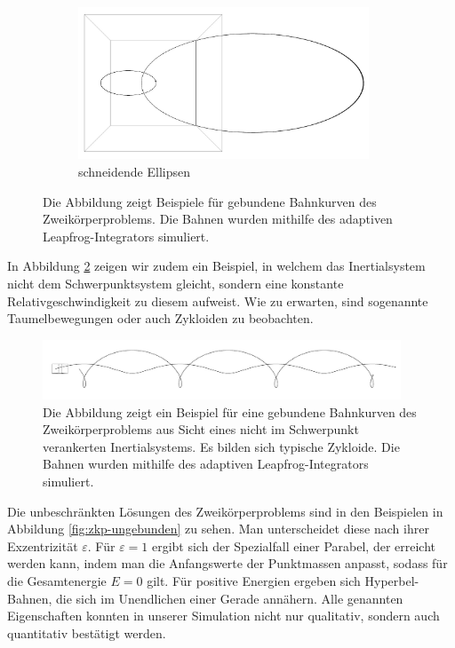 \begin{figure}
      \begin{subfigure}[b]{\textwidth}
        \center
        \includegraphics[width=0.95\textwidth]{pictures/two_body/ellipse_intersect.jpg}
        \caption{schneidende Ellipsen}
      \end{subfigure}
      \caption{Die Abbildung zeigt Beispiele für gebundene Bahnkurven des Zweikörperproblems. Die Bahnen wurden mithilfe des adaptiven Leapfrog-Integrators simuliert.}
      \label{fig:zkp-gebunden}
    \end{figure}

    In Abbildung \ref{fig:zkp-zykloide} zeigen wir zudem ein Beispiel, in welchem das Inertialsystem nicht dem Schwerpunktsystem gleicht, sondern eine konstante Relativgeschwindigkeit zu diesem aufweist.
    Wie zu erwarten, sind sogenannte Taumelbewegungen oder auch Zykloiden zu beobachten.

    \begin{figure}[h]
      \center
      \includegraphics[width=0.95\textwidth]{pictures/two_body/cycloid.jpg}
      \caption{Die Abbildung zeigt ein Beispiel für eine gebundene Bahnkurven des Zweikörperproblems aus Sicht eines nicht im Schwerpunkt verankerten Inertialsystems. Es bilden sich typische Zykloide. Die Bahnen wurden mithilfe des adaptiven Leapfrog-Integrators simuliert.}
      \label{fig:zkp-zykloide}
    \end{figure}

    Die unbeschränkten Lösungen des Zweikörperproblems sind in den Beispielen in Abbildung \ref{fig:zkp-ungebunden} zu sehen.
    Man unterscheidet diese nach ihrer Exzentrizität $\varepsilon$.
    Für $\varepsilon = 1$ ergibt sich der Spezialfall einer Parabel, der erreicht werden kann, indem man die Anfangswerte der Punktmassen anpasst, sodass für die Gesamtenergie $E=0$ gilt.
    Für positive Energien ergeben sich Hyperbel-Bahnen, die sich im Unendlichen einer Gerade annähern.
    Alle genannten Eigenschaften konnten in unserer Simulation nicht nur qualitativ, sondern auch quantitativ bestätigt werden.


